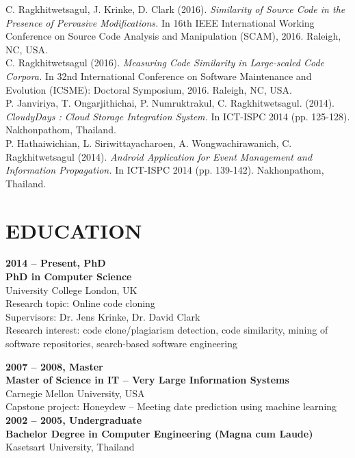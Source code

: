 \documentclass[margin, 10pt]{res} %
\begin{document}
\begin{resume}
C. Ragkhitwetsagul, J. Krinke, D. Clark (2016). \textit{Similarity of Source Code in the Presence of Pervasive Modifications.} In 16th IEEE International Working Conference on Source Code Analysis and Manipulation (SCAM), 2016. Raleigh, NC, USA. \vspace{2mm} \\
C. Ragkhitwetsagul (2016). \textit{Measuring Code Similarity in Large-scaled Code Corpora.} In 32nd International Conference on Software Maintenance and Evolution (ICSME): Doctoral Symposium, 2016. Raleigh, NC, USA. \vspace{2mm} \\
\newpage
P. Janviriya, T. Ongarjithichai, P. Numruktrakul, C. Ragkhitwetsagul. (2014). \textit{CloudyDays : Cloud Storage Integration System.} In ICT-ISPC 2014 (pp. 125-128). Nakhonpathom, Thailand. \vspace{2mm} \\
P. Hathaiwichian, L. Siriwittayacharoen, A. Wongwachirawanich, C. Ragkhitwetsagul (2014). \textit{Android Application for Event Management and Information Propagation.} In ICT-ISPC 2014 (pp. 139-142). Nakhonpathom, Thailand.


\section{EDUCATION}
\textbf{2014 -- Present, PhD}\\
\textbf{PhD in Computer Science}\\
University College London, UK\\
Research topic:  Online code cloning \\
Supervisors: Dr. Jens Krinke, Dr. David Clark\\
Research interest: code clone/plagiarism detection, code similarity, mining of software repositories, search-based software engineering 

\textbf{2007 -- 2008, Master} \\
\textbf{Master of Science in IT -- Very Large Information Systems}\\
Carnegie Mellon University, USA\\
Capstone project: Honeydew -- Meeting date prediction using machine learning \vspace{3mm} \\
\textbf{2002 -- 2005, Undergraduate }\\
\textbf{Bachelor Degree in Computer Engineering (Magna cum Laude)}\\
Kasetsart University, Thailand


\end{resume}
\end{document}
